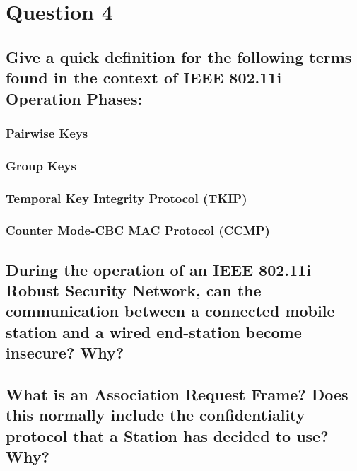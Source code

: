 \documentclass{report}
\begin{document}
	\section{Question 4}
	\startsection
		\renewcommand{\thesubsection}{\thesection.\Alph{subsection}}
		\subsection{Give a quick definition for the following terms found in the context of IEEE 802.11i Operation Phases:}
		\startsubsection
			\subsubsection{Pairwise Keys}
			\startsubsection
			\closesection
			\subsubsection{Group Keys}
			\startsubsection
			\closesection
			\subsubsection{Temporal Key Integrity Protocol (TKIP)}
			\startsubsection
			\closesection
			\subsubsection{Counter Mode-CBC MAC Protocol (CCMP)}
			\startsubsection
			\closesection
		\closesection
		
		\subsection{During the operation of an IEEE 802.11i Robust Security Network, can the communication between a connected mobile station and a wired end-station become insecure? Why?}
		\startsubsection
		\closesection
		
		\subsection{What is an Association Request Frame? Does this normally include the confidentiality protocol that a Station has decided to use? Why?}
		\startsubsection
		\closesection
	\closesection
\end{document}
